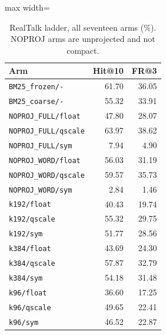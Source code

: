 \begin{table}[H]
\centering
\footnotesize
\caption{RealTalk ladder, all seventeen arms (\%). NOPROJ arms are unprojected and not compact.}
\label{tab:ladder}
\begin{adjustbox}{max width=\linewidth}\begin{tabular}{@{}l r r@{}}
\toprule
Arm & Hit@10 & FR@3 \\
\midrule
\texttt{BM25\_frozen/-} & 61.70 & 36.05 \\
\texttt{BM25\_coarse/-} & 55.32 & 33.91 \\
\texttt{NOPROJ\_FULL/float} & 47.80 & 28.07 \\
\texttt{NOPROJ\_FULL/qscale} & 63.97 & 38.62 \\
\texttt{NOPROJ\_FULL/sym} & 7.94 & 4.90 \\
\texttt{NOPROJ\_WORD/float} & 56.03 & 31.19 \\
\texttt{NOPROJ\_WORD/qscale} & 59.57 & 35.73 \\
\texttt{NOPROJ\_WORD/sym} & 2.84 & 1.46 \\
\texttt{k192/float} & 40.43 & 19.74 \\
\texttt{k192/qscale} & 55.32 & 29.75 \\
\texttt{k192/sym} & 51.77 & 28.56 \\
\texttt{k384/float} & 43.69 & 24.30 \\
\texttt{k384/qscale} & 57.87 & 32.79 \\
\texttt{k384/sym} & 54.18 & 31.48 \\
\texttt{k96/float} & 36.60 & 17.25 \\
\texttt{k96/qscale} & 49.65 & 22.41 \\
\texttt{k96/sym} & 46.52 & 22.87 \\
\bottomrule
\end{tabular}\end{adjustbox}
\end{table}

